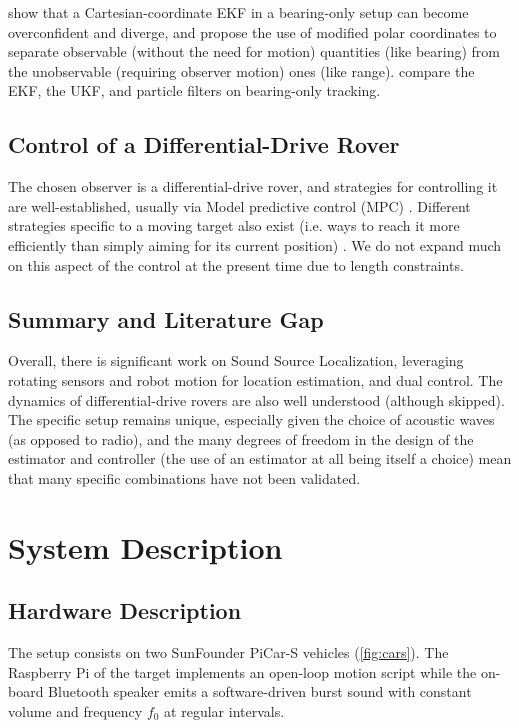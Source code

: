 \documentclass[journal,a4paper]{IEEEtran}
\begin{document}
\citet{aidala1983utilization} show that a Cartesian-coordinate EKF in a bearing-only setup can become overconfident and diverge, and propose the use of modified polar coordinates to separate observable (without the need for motion) quantities (like bearing) from the unobservable (requiring observer motion) ones (like range). \citet{ristic2004beyond} compare the EKF, the UKF, and particle filters on bearing-only tracking.


\subsection{Control of a Differential-Drive Rover}
The chosen observer is a differential-drive rover, and strategies for controlling it are well-established, usually via Model predictive control (MPC)
\citep{mayne2000constrained,rawlings2017model}. Different strategies specific to a moving target also exist (i.e. ways to reach it more efficiently than simply aiming for its current position) \citep{zarchan2012tactical,deghat2014localization,shames2012circumnavigation}. We do not expand much on this aspect of the control at the present time due to length constraints.

\subsection{Summary and Literature Gap}
Overall, there is significant work on Sound Source Localization, leveraging rotating sensors and robot motion for location estimation, and dual control. The dynamics of differential-drive rovers are also well understood (although skipped). The specific setup remains unique, especially given the choice of acoustic waves (as opposed to radio), and the many degrees of freedom in the design of the estimator and controller (the use of an estimator at all being itself a choice) mean that many specific combinations have not been validated.


\section{System Description}
\label{sec:system}

\subsection{Hardware Description}
The setup consists on two SunFounder PiCar-S vehicles  (\autoref{fig:cars}). The Raspberry Pi of the target implements an open-loop motion script while the on-board Bluetooth speaker emits a software-driven burst sound with constant volume and frequency  $f_0$ at regular intervals. 
\end{document}
